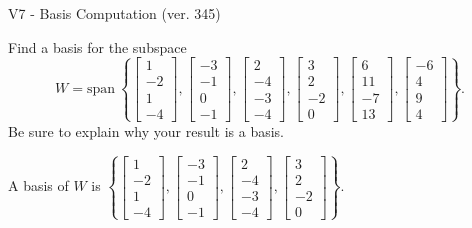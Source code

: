 \begin{exercise}
  \begin{exerciseTitle}V7 - Basis Computation (ver. 345)\end{exerciseTitle}
  \begin{exerciseStatement}
    Find a basis for the subspace 
\[W=\mathrm{span}\ \left\{\left[\begin{array}{r}
1 \\
-2 \\
1 \\
-4
\end{array}\right] , \left[\begin{array}{r}
-3 \\
-1 \\
0 \\
-1
\end{array}\right] , \left[\begin{array}{r}
2 \\
-4 \\
-3 \\
-4
\end{array}\right] , \left[\begin{array}{r}
3 \\
2 \\
-2 \\
0
\end{array}\right] , \left[\begin{array}{r}
6 \\
11 \\
-7 \\
13
\end{array}\right] , \left[\begin{array}{r}
-6 \\
4 \\
9 \\
4
\end{array}\right]\right\}.\]
 Be sure to explain why your result is a basis.


  \end{exerciseStatement}
  \begin{exerciseAnswer}
   A basis of \(W\) is  \(\left\{\left[\begin{array}{r}
1 \\
-2 \\
1 \\
-4
\end{array}\right] , \left[\begin{array}{r}
-3 \\
-1 \\
0 \\
-1
\end{array}\right] , \left[\begin{array}{r}
2 \\
-4 \\
-3 \\
-4
\end{array}\right] , \left[\begin{array}{r}
3 \\
2 \\
-2 \\
0
\end{array}\right]\right\}\).
  


  \end{exerciseAnswer}
\end{exercise}
